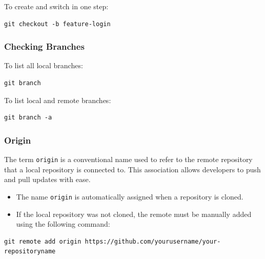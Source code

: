 \documentclass{article}
\newcommand{\codecmd}[1]{\textcolor[rgb]{0,0.5,0}{\texttt{#1}}}
\begin{document}
\noindent To create and switch in one step:

\begin{tcolorbox}[colback=mintgreen, colframe=green!40!black, boxrule=0.5pt, sharp corners]
\begin{verbatim}
git checkout -b feature-login
\end{verbatim}
\end{tcolorbox}

\subsubsection{Checking Branches}

To list all local branches:

\begin{tcolorbox}[colback=mintgreen, colframe=green!40!black, boxrule=0.5pt, sharp corners]
\begin{verbatim}
git branch
\end{verbatim}
\end{tcolorbox}

\noindent To list local and remote branches:

\begin{tcolorbox}[colback=mintgreen, colframe=green!40!black, boxrule=0.5pt, sharp corners]
\begin{verbatim}
git branch -a
\end{verbatim}
\end{tcolorbox}

\subsubsection{Origin}

The term \codecmd{origin} is a conventional name used to refer to the remote repository that a local repository is connected to. This association allows developers to push and pull updates with ease.

\begin{itemize}
    \item The name \codecmd{origin} is automatically assigned when a repository is cloned.
    \item If the local repository was not cloned, the remote must be manually added using the following command:
\end{itemize}

\begin{tcolorbox}[colback=mintgreen, colframe=green!40!black, boxrule=0.5pt, sharp corners]
\begin{verbatim}
git remote add origin https://github.com/yourusername/your-repositoryname
\end{verbatim}
\end{tcolorbox}
\end{document}
